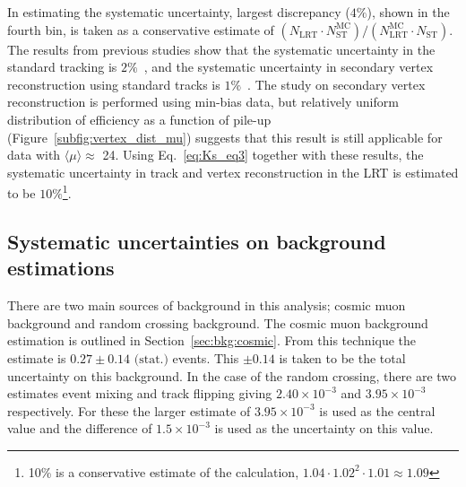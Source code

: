 In estimating the systematic uncertainty, largest discrepancy ($4\%$), shown in the fourth bin, is taken as a conservative estimate of $(N_{\mathrm{LRT}} \cdot N_{\mathrm{ST}}^{\mathrm{MC}}) / (N_{\mathrm{LRT}}^{\mathrm{MC}} \cdot N_{\mathrm{ST}})$. The results from previous studies show that the systematic uncertainty in the standard tracking is $2\%$~\cite{ATL-PHYS-PUB-2015-051}, and the systematic uncertainty in secondary vertex reconstruction using standard tracks is $1\%$~\cite{Aaboud:2215485}. The study on secondary vertex reconstruction is performed using min-bias data, but relatively uniform distribution of efficiency as a function of pile-up (Figure~\ref{subfig:vertex_dist_mu}) suggests that this result is still applicable for data with $\langle \mu \rangle\approx$ 24. Using Eq.~\ref{eq:Ks_eq3} together with these results, the systematic uncertainty in track and vertex reconstruction in the LRT is estimated to be $10\%$\footnote{10\% is a conservative estimate of the calculation, $1.04\cdot1.02^{2}\cdot1.01\approx1.09$}.


%
%
%

\subsection{Systematic uncertainties on background estimations}
\label{sec:syst_bkg}

There are two main sources of background in this analysis; cosmic muon background and random crossing background. The cosmic muon background estimation is outlined in Section~\ref{sec:bkg:cosmic}. From this technique the estimate is $0.27 \pm 0.14 \textrm{ (stat.)}$ events. This $\pm 0.14$ is taken to be the total uncertainty on this background. In the case of the random crossing, there are two estimates event mixing and track flipping giving $2.40\times10^{-3}$ and $3.95 \times 10^{-3}$ respectively. For these the larger estimate of $3.95 \times 10^{-3}$ is used as the central value and the difference of $1.5\times10^{-3}$ is used as the uncertainty on this value.











